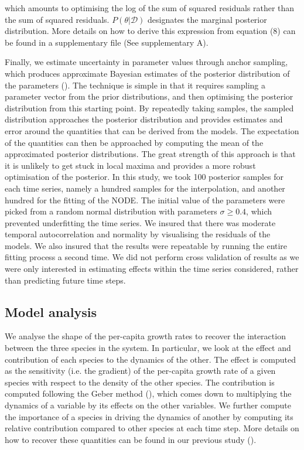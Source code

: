 \documentclass[11pt, oneside]{article}
\begin{document}
which amounts to optimising the log of the sum of squared residuals rather than the sum of squared residuals. $P(\theta | \mathcal{D})$ designates the marginal posterior distribution. 
More details on how to derive this expression from equation (8) can be found in a supplementary file (See supplementary A).

Finally, we estimate uncertainty in parameter values through anchor sampling, which produces approximate Bayesian estimates of the posterior distribution of the parameters (\cite{Pearce2018}).
The technique is simple in that it requires sampling a parameter vector from the prior distributions, and then optimising the posterior distribution from this starting point.
By repeatedly taking samples, the sampled distribution approaches the posterior distribution and provides estimates and error around the quantities that can be derived from the models.
The expectation of the quantities can then be approached by computing the mean of the approximated posterior distributions.
The great strength of this approach is that it is unlikely to get stuck in local maxima and provides a more robust optimisation of the posterior.
In this study, we took 100 posterior samples for each time series, namely a hundred samples for the interpolation, and another hundred for the fitting of the NODE.
The initial value of the parameters were picked from a random normal distribution with parameters $\sigma \geq 0.4$, which prevented underfitting the time series.
We insured that there was moderate temporal autocorrelation and normality by visualising the residuals of the models.
We also insured that the results were repeatable by running the entire fitting process a second time.
We did not perform cross validation of results as we were only interested in estimating effects within the time series considered, rather than predicting future time steps.


\subsection{Model analysis}

We analyse the shape of the per-capita growth rates to recover the interaction between the three species in the system.
In particular, we look at the effect and contribution of each species to the dynamics of the other.
The effect is computed as the sensitivity (i.e. the gradient) of the per-capita growth rate of a given species with respect to the density of the other species.
The contribution is computed following the Geber method (\cite{Hairston2005}), which comes down to multiplying the dynamics of a variable by its effects on the other variables.
We further compute the importance of a species in driving the dynamics of another by computing its relative contribution compared to other species at each time step.
More details on how to recover these quantities can be found in our previous study (\cite{Bonnaffe2021a}).
\end{document}
